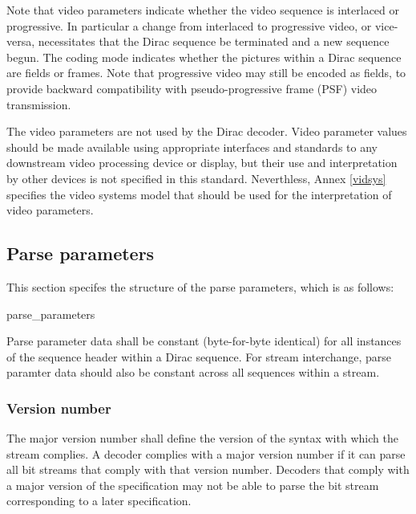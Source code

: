 \begin{informative}
Note that video parameters indicate whether the video sequence is interlaced or progressive.
In particular a change from interlaced to progressive video, or vice-versa, necessitates that
the Dirac sequence be terminated and a new sequence begun. The coding mode indicates whether
the pictures within a Dirac sequence are fields or frames. Note that progressive video may
still be encoded as fields, to provide backward compatibility with pseudo-progressive frame (PSF)
video transmission.

The video parameters are not used by the Dirac decoder. Video parameter values should
be made available using appropriate interfaces and standards to any downstream video
processing device or display, but their use and interpretation by other devices is not specified in this standard. 
Neverthless, Annex \ref{vidsys} specifies the video systems model that should be used for the interpretation
of video parameters.
\end{informative}

\subsection{Parse parameters}
\label{parseparameters}

This section specifes the structure of the parse parameters, which is as follows:

\begin{pseudo}{parse\_parameters}{}
\end{pseudo}

Parse parameter data shall be constant (byte-for-byte identical) for all instances 
of the sequence header within a Dirac sequence. For stream interchange, parse
paramter data should also be constant across all sequences within a stream.

\subsubsection{Version number}

The major version number shall define the version of the syntax with 
which the stream complies. A decoder complies with a major version 
number if it can parse all bit streams that comply with 
that version number. Decoders that comply with a major version of 
the specification may not be able to parse the bit stream corresponding 
to a later specification.

